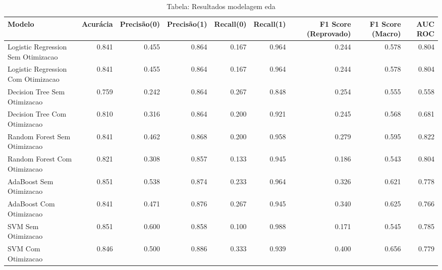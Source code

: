 \begin{table}[H] %
    \centering
    \caption{Tabela: Resultados modelagem eda}
    \label{tab:resultados_modelagem_eda}
    \renewcommand{\arraystretch}{1.25} %
    \begin{adjustwidth}{ -1in }{ -1in } %
    \centering %
    \small %
    \begin{tabular}{lrrrrrrrr}
\toprule
                            Modelo &  Acurácia &  Precisão(0) &  Precisão(1) &  Recall(0) &  Recall(1) &  F1 Score (Reprovado) &  F1 Score (Macro) &  AUC ROC \\
\midrule
Logistic Regression Sem Otimizacao &     0.841 &        0.455 &        0.864 &      0.167 &      0.964 &                 0.244 &             0.578 &    0.804 \\
Logistic Regression Com Otimizacao &     0.841 &        0.455 &        0.864 &      0.167 &      0.964 &                 0.244 &             0.578 &    0.804 \\
      Decision Tree Sem Otimizacao &     0.759 &        0.242 &        0.864 &      0.267 &      0.848 &                 0.254 &             0.555 &    0.558 \\
      Decision Tree Com Otimizacao &     0.810 &        0.316 &        0.864 &      0.200 &      0.921 &                 0.245 &             0.568 &    0.681 \\
      Random Forest Sem Otimizacao &     0.841 &        0.462 &        0.868 &      0.200 &      0.958 &                 0.279 &             0.595 &    0.822 \\
      Random Forest Com Otimizacao &     0.821 &        0.308 &        0.857 &      0.133 &      0.945 &                 0.186 &             0.543 &    0.804 \\
           AdaBoost Sem Otimizacao &     0.851 &        0.538 &        0.874 &      0.233 &      0.964 &                 0.326 &             0.621 &    0.778 \\
           AdaBoost Com Otimizacao &     0.841 &        0.471 &        0.876 &      0.267 &      0.945 &                 0.340 &             0.625 &    0.766 \\
                SVM Sem Otimizacao &     0.851 &        0.600 &        0.858 &      0.100 &      0.988 &                 0.171 &             0.545 &    0.785 \\
                SVM Com Otimizacao &     0.846 &        0.500 &        0.886 &      0.333 &      0.939 &                 0.400 &             0.656 &    0.779 \\
\bottomrule
\end{tabular}
    \end{adjustwidth}
    \renewcommand{\arraystretch}{1.0} %
\end{table}
